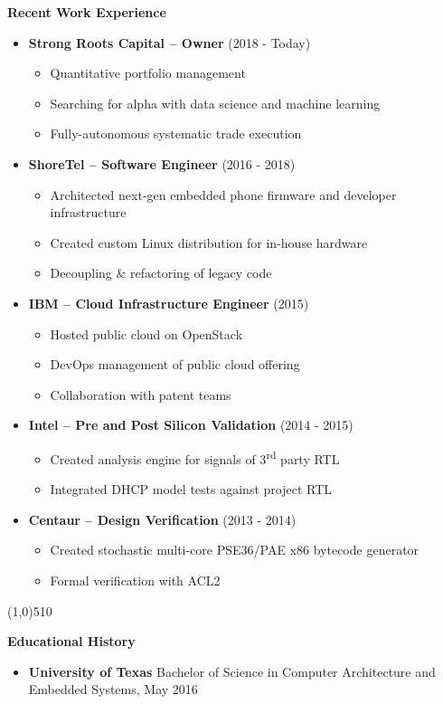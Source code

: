 \documentclass{report}
\newcommand{\cut}{\begin{center} \line(1,0){510} \end{center}}
\begin{document}
\textbf{Recent Work Experience}
\begin{itemize}[label=$\cdot$]

\item \textbf{Strong Roots Capital -- Owner} (2018 - Today)
  \begin{itemize}[label=$\circ$]
  \item Quantitative portfolio management
  \item Searching for alpha with data science and machine learning
  \item Fully-autonomous systematic trade execution
  \end{itemize}

\item \textbf{ShoreTel -- Software Engineer} (2016 - 2018)
  \begin{itemize}[label=$\circ$]
  \item Architected next-gen embedded phone firmware and  developer infrastructure
  \item Created custom Linux distribution for in-house hardware
  \item Decoupling \& refactoring of legacy code
  \end{itemize}

\item \textbf{IBM -- Cloud Infrastructure Engineer} (2015)
  \begin{itemize}[label=$\circ$]
  \item Hosted public cloud on OpenStack
  \item DevOps management of public cloud offering
  \item Collaboration with patent teams
  \end{itemize}

\item \textbf{Intel -- Pre and Post Silicon Validation} (2014 - 2015)
  \begin{itemize}[label=$\circ$]
  \item Created analysis engine for signals of 3\textsuperscript{rd} party RTL
  \item Integrated DHCP model tests against project RTL
  \end{itemize}

\item \textbf{Centaur -- Design Verification} (2013 - 2014)
  \begin{itemize}[label=$\circ$]
  \item Created stochastic multi-core PSE36/PAE x86 bytecode generator
  \item Formal verification with ACL2
  \end{itemize}

\end{itemize}

\cut{}

\textbf{Educational History}
\begin{itemize}[label=$\cdot$]
\item \textbf{University of Texas} Bachelor of Science in Computer Architecture and Embedded Systems, May 2016
\end{itemize}
\end{document}
